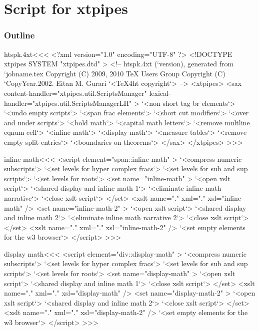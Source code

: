 \documentclass{article}
\begin{document}



\part{Script for xtpipes}


\section{Outline}







\<htspk.4xt\><<<
<?xml version="1.0" encoding="UTF-8" ?>
<!DOCTYPE xtpipes SYSTEM "xtpipes.dtd" >
<!-- htspk.4xt (`version), generated from `jobname.tex
     Copyright (C) 2009, 2010 TeX Users Group
     Copyright (C) `CopyYear.2002. Eitan M. Gurari
`<TeX4ht copyright`> -->
<xtpipes>
   <sax content-handler="xtpipes.util.ScriptsManager"
        lexical-handler="xtpipes.util.ScriptsManagerLH" >
     `<non short tag br elements`>     
     `<undo empty scripts`> 
     `<span frac elements`>
     `<short cut modifiers`>
     `<over and under scripts`>
     `<bold math`>
     `<capital math letters`>
     `<remove multline eqnum cell`> 
     `<inline math`>
     `<display math`>
     `<measure tables`>
     `<remove empty split entries`>
     `<boundaries on theorems`>
   </sax>
</xtpipes>
>>>



\<inline math\><<<
<script element="span::inline-math" >
  `<compress numeric subscripts`>
  `<set levels for hyper complex fracs`>
  `<set levels for sub and sup scripts`>
  `<set levels for roots`>
  <set name="inline-math" >
     `<open xslt script`>
     `<shared display and inline math 1`>
     `<eliminate inline math narrative`>
     `<close xslt script`>
  </set>
  <xslt name="." xml="." xsl="inline-math" />
  <set name="inline-math-2" >
     `<open xslt script`>
     `<shared display and inline math 2`>
     `<eliminate inline math narrative 2`>
     `<close xslt script`>
  </set>
  <xslt name="." xml="." xsl="inline-math-2" />
  `<set empty elements for the w3 browser`>
</script> 
>>>




\<display math\><<<
<script element="div::display-math" >
  `<compress numeric subscripts`>
  `<set levels for hyper complex fracs`>
  `<set levels for sub and sup scripts`>
  `<set levels for roots`>
  <set name="display-math" >
     `<open xslt script`>
     `<shared display and inline math 1`>
     `<close xslt script`>
  </set>
  <xslt name="." xml="." xsl="display-math" />
  <set name="display-math-2" >
     `<open xslt script`>
     `<shared display and inline math 2`>
     `<close xslt script`>
  </set>
  <xslt name="." xml="." xsl="display-math-2" />
  `<set empty elements for the w3 browser`>
</script> 
>>>
\end{document}
